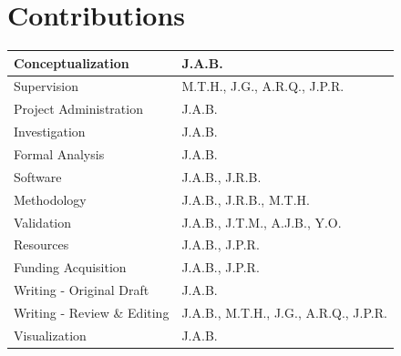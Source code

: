 \documentclass[11pt, a4paper, oneside]{article}
\begin{document}
\section*{Contributions}
\begin{tabular}{ l l }
 Conceptualization & J.A.B. \\
 \hline
 Supervision & M.T.H., J.G., A.R.Q., J.P.R. \\
 \hline
 Project Administration & J.A.B. \\
 \hline
 Investigation & J.A.B. \\
 \hline
 Formal Analysis & J.A.B. \\
 \hline
 Software & J.A.B., J.R.B. \\
 \hline
 Methodology & J.A.B., J.R.B., M.T.H. \\
 \hline
 Validation & J.A.B., J.T.M., A.J.B., Y.O. \\
 \hline
 Resources & J.A.B., J.P.R. \\
 \hline
 Funding Acquisition & J.A.B., J.P.R. \\
 \hline
 Writing - Original Draft & J.A.B. \\
 \hline
 Writing - Review \& Editing & J.A.B., M.T.H., J.G., A.R.Q., J.P.R. \\
 \hline
 Visualization & J.A.B.
\end{tabular}




\end{document}
